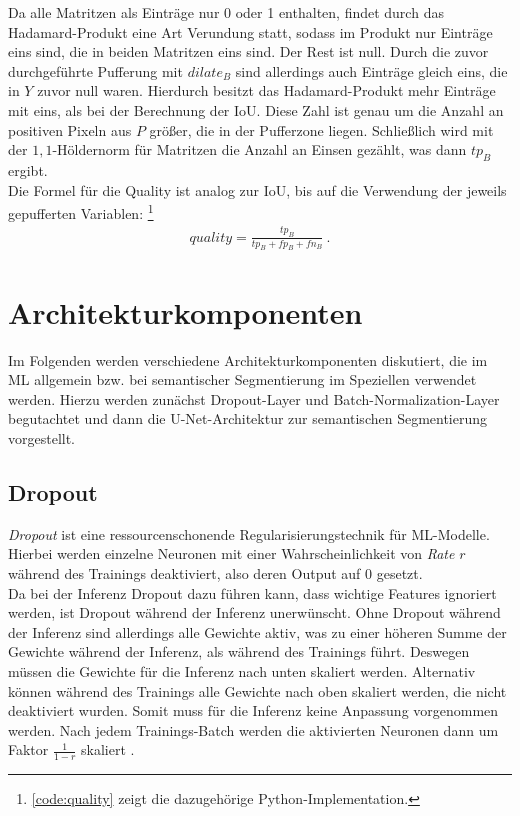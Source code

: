 Da alle Matritzen als Einträge nur 0 oder 1 enthalten, findet durch das Hadamard-Produkt eine Art Verundung statt, 
sodass im Produkt nur Einträge eins sind, die in beiden Matritzen eins sind. Der Rest ist null. 
Durch die zuvor durchgeführte Pufferung mit $dilate_B$ sind allerdings auch Einträge gleich eins, die in $Y$ 
zuvor null waren. Hierdurch besitzt das Hadamard-Produkt mehr Einträge mit eins, als bei der Berechnung der \ac{IoU}.
Diese Zahl ist genau um die Anzahl an positiven Pixeln aus $P$ größer, die in der Pufferzone liegen. 
Schließlich wird mit der $1,1$-Höldernorm für Matritzen die Anzahl an Einsen gezählt, was dann $tp_B$ ergibt. \\
Die Formel für die Quality ist analog zur \ac{IoU}, bis auf die Verwendung der jeweils gepufferten Variablen:
\footnote{\autoref{code:quality} zeigt die dazugehörige Python-Implementation.}
\begin{align}
	\label{eq:quality} quality = \frac{tp_B}{tp_B + fp_B + fn_B} ~.
\end{align}

\section{Architekturkomponenten}

Im Folgenden werden verschiedene Architekturkomponenten diskutiert, die im \ac{ML} allgemein 
bzw. bei semantischer Segmentierung im Speziellen verwendet werden. Hierzu werden zunächst Dropout-Layer 
und Batch-Normalization-Layer begutachtet und dann die U-Net-Architektur zur semantischen Segmentierung vorgestellt. 

\subsection{Dropout} \label{sec:architekturkomponenten:dropout}

\textit{Dropout} ist eine ressourcenschonende Regularisierungstechnik für \ac{ML}-Modelle. 
Hierbei werden einzelne Neuronen mit einer Wahrscheinlichkeit von \textit{Rate} $r$ während des Trainings 
deaktiviert, also deren Output auf $0$ gesetzt.\\ 
Da bei der Inferenz Dropout dazu führen kann, 
dass wichtige Features ignoriert werden, ist Dropout während der Inferenz unerwünscht. Ohne Dropout während der 
Inferenz sind allerdings alle Gewichte aktiv, was zu einer höheren Summe der Gewichte während der Inferenz, 
als während des Trainings führt. Deswegen müssen die Gewichte für die Inferenz nach unten skaliert werden. 
Alternativ können während des Trainings alle Gewichte nach oben skaliert werden, die nicht deaktiviert wurden. 
Somit muss für die Inferenz keine Anpassung vorgenommen werden. Nach jedem Trainings-Batch werden die aktivierten 
Neuronen dann um Faktor $\frac{1}{1-r}$ skaliert \cites[S.~255--258]{Goodfellow.2016}{NitishSrivastava.2014}.

